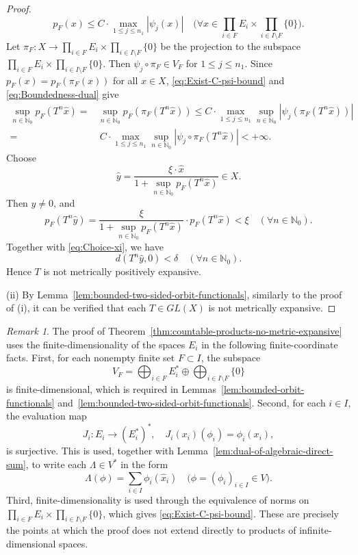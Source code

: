 \documentclass[11pt]{amsart}
\theoremstyle{definition}
\theoremstyle{remark}
\newtheorem{remark}{Remark}
\theoremstyle{plain}
\begin{document}
\begin{proof}
\begin{equation}
p_F(x)\le C\cdot\max_{1\le j\le n_1}|\psi_j(x)|
\quad\bigg(\forall x\in \prod_{i\in F}E_i\times
\prod_{i\in I\setminus F}\{0\}\bigg).
\end{equation}
Let \(\pi_F:X\to\prod_{i\in F}E_i\times \prod_{i\in I\setminus F}\{0\}\)
be the projection to the subspace
$\prod_{i\in F}E_i\times \prod_{i\in I\setminus F}\{0\}$.
Then $\psi_j\circ \pi_F\in V_F$ for \(1\leq j\leq n_1\).
Since $p_{F}(x)=p_{F}(\pi_F(x))$ for all
$x\in X$, \eqref{eq:Exist-C-psi-bound} and
\eqref{eq:Boundedness-dual} give
\begin{align*}
\sup_{n\in\mathbb{N}_0}p_F(T^n \hat{x})
= & \sup_{n\in\mathbb{N}_0}p_F(\pi_F(T^n \hat{x}))
\le C\cdot \max_{1\le j\le n_1}
\sup_{n\in\mathbb{N}_0}|\psi_j(\pi_F(T^n\hat{x}))|\\
= &~ C\cdot \max_{1\le j\le n_1}
\sup_{n\in\mathbb{N}_0}|\psi_j\circ \pi_F(T^n\hat{x})|
<+\infty.
\end{align*}
Choose
\[
\hat{y}=\frac{\xi\cdot\hat{x}}{1+\sup_{n\in\mathbb{N}_0}p_F(T^n \hat{x})}
\in X.
\]
Then \(\hat{y}\ne0\), and
\[
p_F(T^n \hat{y})=\frac{\xi}{1+\sup_{n\in\mathbb{N}_0}p_F(T^n \hat{x})}\cdot p_F(T^n \hat{x})<\xi
\quad(\forall n\in\mathbb{N}_0).
\]
Together with \eqref{eq:Choice-xi}, we have
\[
d(T^n \hat{y},0)<\delta
\quad(\forall n\in\mathbb{N}_0).
\]
Hence \(T\) is not metrically positively expansive.

\medskip

(ii) By Lemma~\ref{lem:bounded-two-sided-orbit-functionals}, similarly to
the proof of {\rm (i)}, it can be verified that each \(T\in GL(X)\) is not
metrically expansive.
\end{proof}

\begin{remark}\label{rem:finite-dimensional-product-scope}
The proof of Theorem~\ref{thm:countable-products-no-metric-expansive}
uses the finite-dimensionality of the spaces \(E_i\) in the following
finite-coordinate facts.  First, for each nonempty finite set
\(F\subset I\), the subspace
\[
V_F=\bigoplus_{i\in F}E_i^*
\oplus
\bigoplus_{i\in I\setminus F}\{0\}
\]
is finite-dimensional, which is required in
Lemmas~\ref{lem:bounded-orbit-functionals}
and~\ref{lem:bounded-two-sided-orbit-functionals}.
Second, for each \(i\in I\), the evaluation map
\[
J_i:E_i\to(E_i^*)^*,
\quad
J_i(x_i)(\phi_i)=\phi_i(x_i),
\]
is surjective.  This is used, together with
Lemma~\ref{lem:dual-of-algebraic-direct-sum},
to write each \(\Lambda\in V^*\) in the form
\[
\Lambda(\phi)=\sum_{i\in I}\phi_i(\hat{x}_i)
\quad
\big(\phi=(\phi_i)_{i\in I}\in V\big).
\]
Third, finite-dimensionality is used through the equivalence of norms on
\(\prod_{i\in F}E_i\times \prod_{i\in I\setminus F}\{0\}\), which gives
\eqref{eq:Exist-C-psi-bound}.  These are precisely the points at which
the proof does not extend directly to products of infinite-dimensional
spaces.
\end{remark}
\end{document}
